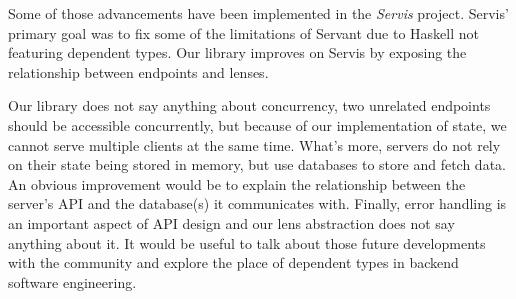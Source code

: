 \documentclass[sigplan,screen,review, nonacm]{acmart}
\begin{document}
Some of those advancements have been implemented in the \emph{Servis}\cite{servis} project.
Servis' primary goal was to fix some of the limitations of Servant due to Haskell not featuring
dependent types. Our library improves on Servis by exposing the relationship between endpoints and
lenses.

Our library does not say anything about concurrency, two unrelated endpoints should be accessible
concurrently, but because of our implementation of state, we cannot serve multiple clients at the
same time.
What's more, servers do not rely on their state being stored in memory, but use databases to store
and fetch data. An obvious improvement would be to explain the relationship between the server's API
and the database(s) it communicates with. Finally, error handling is an important aspect of API design
and our lens abstraction does not say anything about it. It would be useful to talk about those future
developments with the community and explore the place of dependent types in
backend software engineering.

\newpage


\end{document}
